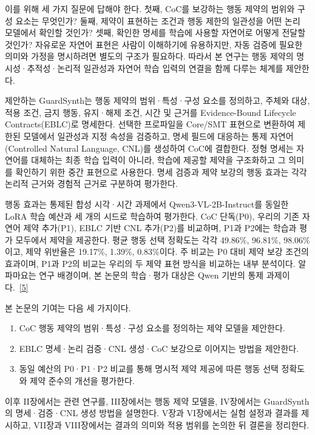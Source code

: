 \documentclass[11pt,a4paper]{article}
\begin{document}
이를 위해 세 가지 질문에 답해야 한다. 첫째, CoC를 보강하는 행동 제약의 범위와 구성 요소는 무엇인가? 둘째, 제약이 표현하는 조건과 행동 제한의 일관성을 어떤 논리 모델에서 확인할 것인가? 셋째, 확인한 명세를 학습에 사용할 자연어로 어떻게 전달할 것인가? 자유로운 자연어 표현은 사람이 이해하기에 유용하지만, 자동 검증에 필요한 의미와 가정을 명시하려면 별도의 구조가 필요하다. 따라서 본 연구는 행동 제약의 명시성·추적성·논리적 일관성과 자연어 학습 입력의 연결을 함께 다루는 체계를 제안한다.\par\vspace{5pt}
제안하는 GuardSynth는 행동 제약의 범위·특성·구성 요소를 정의하고, 주체와 대상, 적용 조건, 금지 행동, 유지·해제 조건, 시간 및 근거를 Evidence-Bound Lifecycle Contracts(EBLC)로 명세한다. 선택한 프로파일을 Core/SMT 표현으로 변환하여 제한된 모델에서 일관성과 지정 속성을 검증하고, 명세 필드에 대응하는 통제 자연어(Controlled Natural Language, CNL)를 생성하여 CoC에 결합한다. 정형 명세는 자연어를 대체하는 최종 학습 입력이 아니라, 학습에 제공할 제약을 구조화하고 그 의미를 확인하기 위한 중간 표현으로 사용한다. 명세 검증과 제약 보강의 행동 효과는 각각 논리적 근거와 경험적 근거로 구분하여 평가한다.\par\vspace{5pt}
행동 효과는 통제된 합성 시각·시간 과제에서 Qwen3-VL-2B-Instruct를 동일한 LoRA 학습 예산과 세 개의 시드로 학습하여 평가한다. CoC 단독(P0), 우리의 기존 자연어 제약 추가(P1), EBLC 기반 CNL 추가(P2)를 비교하며, P1과 P2에는 학습과 평가 모두에서 제약을 제공한다. 평균 행동 선택 정확도는 각각 49.86\%, 96.81\%, 98.06\%이고, 제약 위반율은 19.17\%, 1.39\%, 0.83\%이다. 주 비교는 P0 대비 제약 보강 조건의 효과이며, P1과 P2의 비교는 우리의 두 제약 표현 방식을 비교하는 내부 분석이다. 알파마요는 연구 배경이며, 본 논문의 학습·평가 대상은 Qwen 기반의 통제 과제이다.~\href{\detokenize{../temporal-experiment-closure-2026-09-29-001/all_primary_metrics.csv}}{[5]}\par\vspace{5pt}
본 논문의 기여는 다음 세 가지이다.\par\vspace{5pt}
\begin{enumerate}
\item CoC 행동 제약의 범위·특성·구성 요소를 정의하는 제약 모델을 제안한다.
\item EBLC 명세·논리 검증·CNL 생성·CoC 보강으로 이어지는 방법을 제안한다.
\item 동일 예산의 P0·P1·P2 비교를 통해 명시적 제약 제공에 따른 행동 선택 정확도와 제약 준수의 개선을 평가한다.
\end{enumerate}
이후 II장에서는 관련 연구를, III장에서는 행동 제약 모델을, IV장에서는 GuardSynth의 명세·검증·CNL 생성 방법을 설명한다. V장과 VI장에서는 실험 설정과 결과를 제시하고, VII장과 VIII장에서는 결과의 의미와 적용 범위를 논의한 뒤 결론을 정리한다.\par\vspace{5pt}
\end{document}
